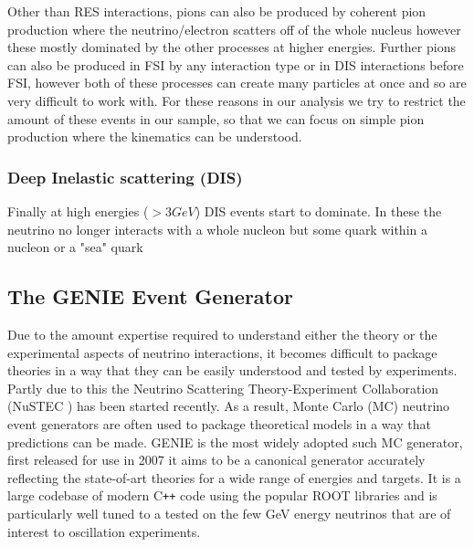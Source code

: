 \documentclass[a4paper,12pt]{article}
\begin{document}
Other than RES interactions, pions can also be produced by coherent pion production where the neutrino/electron scatters off of the whole nucleus \cite{sogarwalCoherentPionProduction2022,higueraMeasurementCoherentProduction2014} however these mostly dominated by the other processes at higher energies.
Further pions can also be produced in FSI by any interaction type or in DIS interactions before FSI, however both of these processes can create many particles at once and so are very difficult to work with.
For these reasons in our analysis we try to restrict the amount of these events in our sample, so that we can focus on simple pion production where the kinematics can be understood.

\subsubsection{Deep Inelastic scattering (DIS)}
Finally at high energies ($>3\si{GeV}$) DIS events start to dominate.
In these the neutrino no longer interacts with a whole nucleon but some quark within a nucleon or a "sea" quark

\subsection{The GENIE Event Generator \cite{andreopoulosGENIENeutrinoMonte2010}}\label{sec:genie}
Due to the amount expertise required to understand either the theory or the experimental aspects of neutrino interactions, it becomes difficult to package theories in a way that they can be easily understood and tested by experiments.
Partly due to this the Neutrino Scattering Theory-Experiment Collaboration (NuSTEC \cite{alvarez-rusoNuSTEC11NeutrinoScattering2018}) has been started recently.
As a result, Monte Carlo (MC) neutrino event generators are often used to package theoretical models in a way that predictions can be made.
GENIE is the most widely adopted such MC generator, first released for use in 2007 it aims to be a canonical generator accurately reflecting the state-of-art theories for a wide range of energies and targets.
It is a large codebase of modern C\texttt{++} code using the popular ROOT libraries\cite{brunROOTObjectOriented1997} and is particularly well tuned to a tested on the few \si{GeV} energy neutrinos that are of interest to oscillation experiments.
\end{document}
